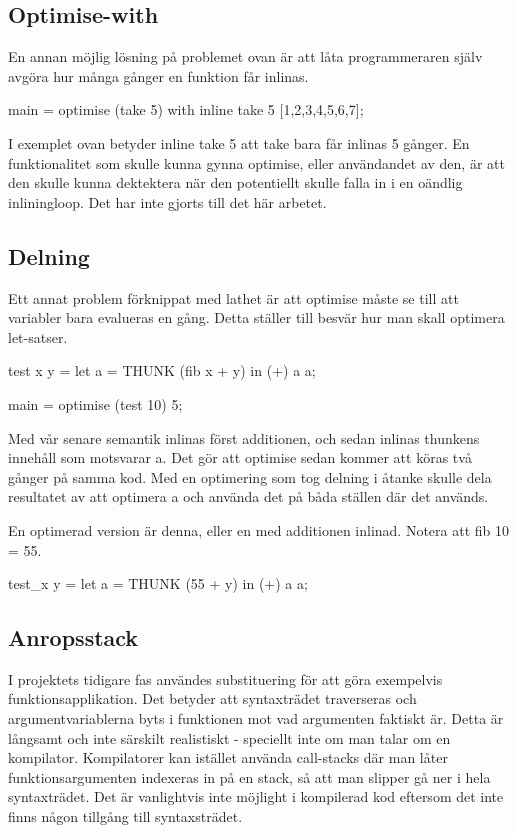 \documentclass[Rapport]{subfiles}
\begin{document}
\subsection{Optimise-with}
En annan möjlig lösning på problemet ovan är att låta programmeraren själv avgöra hur
många gånger en funktion får inlinas.

\begin{codeEx}
main = optimise (take 5) with { inline take 5 } [1,2,3,4,5,6,7];
\end{codeEx}

I exemplet ovan betyder inline take 5 att take bara får inlinas 5 gånger.
En funktionalitet som skulle kunna gynna optimise, eller användandet av den,
är att den skulle kunna dektektera när den potentiellt skulle falla in i en
oändlig inliningloop. Det har inte gjorts till det här arbetet.

\subsection{Delning}
Ett annat problem förknippat med lathet är att optimise måste se till att variabler bara 
evalueras en gång. Detta ställer till besvär hur man skall optimera let-satser.

\begin{codeEx}
test x y = let
    { a = THUNK (fib x + y)
    } in (+) a a;

main = optimise (test 10) 5;
\end{codeEx}

Med vår senare semantik inlinas först additionen, och sedan inlinas thunkens innehåll
som motsvarar a. Det gör att optimise sedan kommer att
köras två gånger på samma kod. Med en optimering som tog delning i åtanke 
skulle dela resultatet av att optimera a och använda det på båda ställen där det används.

En optimerad version är denna, eller en med additionen inlinad. Notera att fib 10 = 55.

\begin{codeEx}
test_x y = let
    { a = THUNK (55 + y)
    } in (+) a a;
\end{codeEx}

\subsection{Anropsstack}

I projektets tidigare fas användes substituering för att göra exempelvis funktionsapplikation.
Det betyder att syntaxträdet traverseras och argumentvariablerna byts i funktionen
mot vad argumenten faktiskt är. Detta är långsamt och inte särskilt realistiskt - 
speciellt inte om man talar om en kompilator. Kompilatorer kan istället använda call-stacks
där man låter funktionsargumenten indexeras in på en stack, så att man slipper
gå ner i hela syntaxträdet. Det är vanlightvis inte möjlight i kompilerad kod eftersom
det inte finns någon tillgång till syntaxsträdet.
\end{document}
